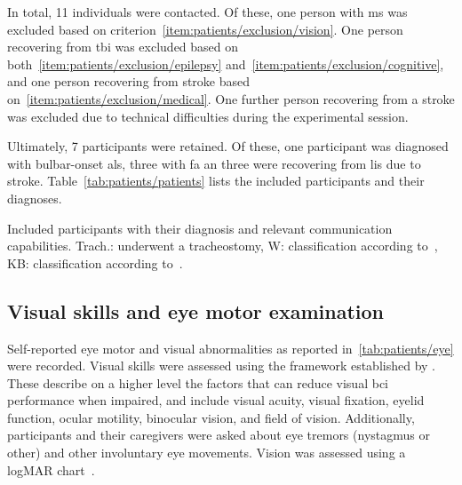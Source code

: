 \documentclass{article}
\newcommand{\skill}{{\color{gdvGreen}{$\pmb{+}$}}}
\newcommand{\noskill}{{\color{gdvOrange}{$\pmb{-}$}}}
\newcommand{\snoskill}{{\color{gdvRed}{$\pmb{/}$}}}
\begin{document}
In total, 11 individuals were contacted. Of these, one person with
\ac{ms} was excluded based on criterion~\ref{item:patients/exclusion/vision}.
One person recovering from \ac{tbi} was excluded based on both~\ref{item:patients/exclusion/epilepsy}
and~\ref{item:patients/exclusion/cognitive}, and one person recovering from
stroke based on~\ref{item:patients/exclusion/medical}.
One further person recovering from a stroke was excluded due to technical
difficulties during the experimental session.

Ultimately, 7 participants were retained.
Of these, one participant was diagnosed with bulbar-onset \ac{als}, three with
\ac{fa} an three were recovering from \ac{lis} due to stroke.
Table~\ref{tab:patients/patients} lists the included participants and their
diagnoses.
\begin{table}
	\centering
	\footnotesize
	
	\caption{Included participants with their diagnosis and relevant communication
		capabilities.
		Trach.: underwent a tracheostomy, W: classification according
		to~\textcite{Wolpaw2006}, KB: classification according
		to~\textcite{Kuebler2008}.
	}
	\label{tab:patients/patients}
\end{table}

\subsection{Visual skills and eye motor examination}

Self-reported eye motor and visual abnormalities as reported in~\cref{tab:patients/eye}
were recorded.
Visual skills were assessed using the framework established by \textcite{FriedOken2020}.
These describe on a higher level the factors that can reduce visual \ac{bci} performance when impaired,
and include visual acuity, visual fixation, eyelid function, ocular motility,
binocular vision, and field of vision.
Additionally, participants and their caregivers were asked about eye tremors
(nystagmus or other) and other involuntary eye movements.
Vision was assessed using a logMAR chart~\cite{Bailey1976}.
\begin{table}
	
	\caption[Visual skills of the included participants.]{%
		Self-reported visual skills as defined by \textcite{FriedOken2020} of
		gaze-impaired participants included in this study.
		\skill\ skilled, \noskill\ impaired, \snoskill\ severely impaired.
		Visual acuity was assessed using the logMAR scale (lower is better).}
	\label{tab:patients/eye}
\end{table}
\end{document}
